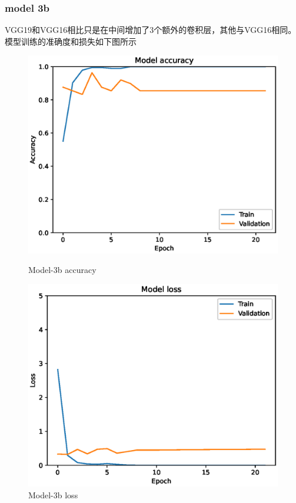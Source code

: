 \subsubsection{model 3b}
VGG19和VGG16相比只是在中间增加了3个额外的卷积层，其他与VGG16相同。模型训练的准确度和损失如下图所示

\begin{figure}
    \centering
    \begin{minipage}{0.45\textwidth}
        \centering
        \includegraphics[width=\textwidth]{./fig/model3/accuracy3b.eps}
        \caption{Model-3b accuracy}
        \label{fig:model3b_acc}
    \end{minipage}
    \begin{minipage}{0.45\textwidth}
        \centering
        \includegraphics[width=\textwidth]{./fig/model3/loss3b.eps}
        \caption{Model-3b loss}
        \label{fig:model3b_loss}
    \end{minipage}
\end{figure}

